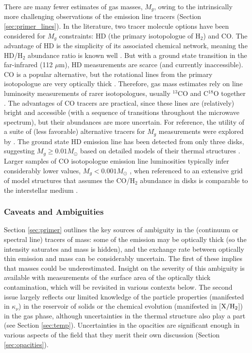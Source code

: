 \documentclass[a4paper]{ar-1col}
\begin{document}
There are many fewer estimates of gas masses, $M_g$, owing to the intrinsically more challenging observations of the emission line tracers (Section \ref{sec:primer_lines}).  In the literature, two tracer molecule options have been considered for $M_g$ constraints: HD (the primary isotopologue of H$_2$) and CO.  The advantage of HD is the simplicity of its associated chemical network, meaning the HD/H$_2$ abundance ratio is known well \citep{bergin13,mcclure16,trapman17}.  But with a ground state transition in the far-infrared (112 $\mu$m), HD measurements are scarce (and currently inaccessible).  CO is a popular alternative, but the rotational lines from the primary isotopologue are very optically thick \citep{beckwith93}.  Therefore, gas mass estimates rely on line luminosity measurements of rarer isotopologues, usually $^{13}$CO and C$^{18}$O together \citep{williamsbest14}.  The advantages of CO tracers are practical, since these lines are (relatively) bright and accessible (with a sequence of transitions throughout the microwave spectrum), but their abundances are more uncertain.  For reference, the utility of a suite of (less favorable) alternative tracers for $M_g$ measurements were explored by \citet{molyarova17}.  The ground state HD emission line has been detected from only three disks, suggesting $M_g \ge 0.01 M_\odot$ based on detailed models of their thermal structures \citep{bergin13,mcclure16}.  Larger samples of CO isotopologue emission line luminosities typically infer considerably lower values, $M_g < 0.001 M_\odot$ \citep[and detection rates are relatively low; e.g.,][]{ansdell16,long17}, when referenced to an extensive grid of model structures that assumes the CO/H$_2$ abundance in disks is comparable to the interstellar medium \citep{williamsbest14}.     


\subsubsection{Caveats and Ambiguities}
Section \ref{sec:primer} outlines the key sources of ambiguity in the (continuum or spectral line) tracers of mass: some of the emission may be optically thick (so the intensity saturates and mass is hidden), and the exchange rate between optically thin emission and mass can be considerably uncertain.  The first of these implies that masses could be underestimated.  Insight on the severity of this ambiguity is available with measurements of the surface area of the optically thick contamination, which will be revisited in various contexts below.  The second issue largely reflects our limited knowledge of the particle properties (manifested in $\kappa_\nu$) in the reservoir of solids or the chemical evolution (manifested in [${\rm X}/{\rm H}_2$]) in the gas phase, although uncertainties in the thermal structure also play a part (see Section \ref{sec:temp}).  Uncertainties in the opacities are significant enough in various aspects of the field that they merit their own discussion (Section \ref{sec:opacities}).           
\end{document}
